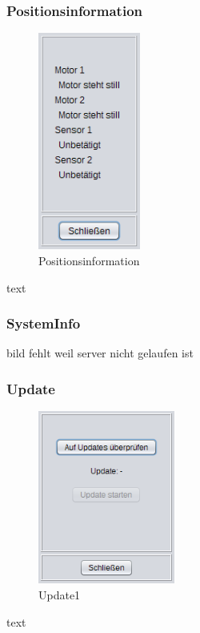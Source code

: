 \subsubsection{Positionsinformation}
\begin{figure}
\vspace{-20pt}
  \begin{center}
    \includegraphics[width=0.30\textwidth]{Bilder/GUI/Positionsinformation}
  \end{center}
  \caption{Positionsinformation}
  \label{Positionsinformation}
  \vspace{-40pt}
\end{figure}
text

\subsubsection{SystemInfo}
bild fehlt weil server nicht gelaufen ist

\newpage

\subsubsection{Update}
\begin{figure}
\vspace{-20pt}
  \begin{center}
    \includegraphics[width=0.40\textwidth]{Bilder/GUI/Update1}
  \end{center}
  \caption{Update1}
  \label{Update}
  \vspace{-40pt}
\end{figure}
text

